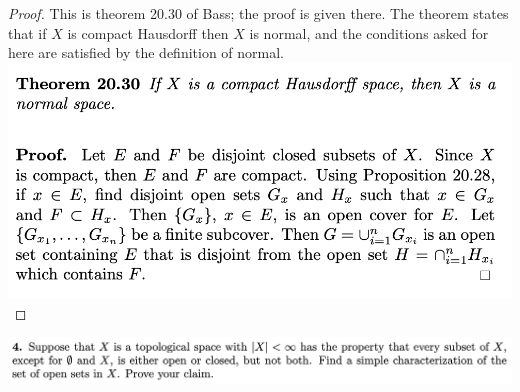 \begin{proof}
  This is theorem 20.30 of Bass; the proof is given there. The theorem states that if $X$ is compact Hausdorff
  then $X$ is normal, and the conditions asked for here are satisfied by the definition of normal.\\
  \includegraphics[width=400pt]{img/analysis--berkeley-202a-hw13-7531.png}
\end{proof}


\newpage
\begin{mdframed}
\includegraphics[width=400pt]{img/analysis--berkeley-202a-hw13-9356.png}
\end{mdframed}





